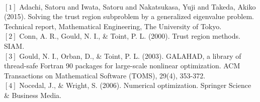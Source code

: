 \hslreferences\\
$[1]$ Adachi, Satoru and Iwata, Satoru and Nakatsukasa, Yuji and Takeda, Akiko (2015).
Solving the trust region subproblem by a generalized eigenvalue problem.
Technical report, Mathematical Engineering, The University of Tokyo.\\
$[2]$ Conn, A. R., Gould, N. I., \& Toint, P. L. (2000). Trust region methods. SIAM.\\
$[3]$ Gould, N. I., Orban, D., \& Toint, P. L. (2003). GALAHAD, a library of thread-safe Fortran 90 packages for large-scale nonlinear optimization. ACM Transactions on Mathematical Software (TOMS), 29(4), 353-372.\\
$[4]$ Nocedal, J., \& Wright, S. (2006). Numerical optimization. Springer Science \& Business Media.

